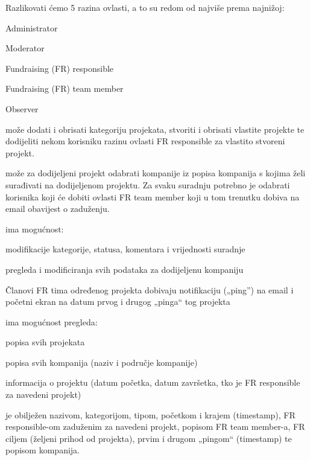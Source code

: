 		{Razlikovati ćemo 5 razina ovlasti, a to su redom od najviše prema najnižoj:}
		\begin{packed_item}
			\item {Administrator}
			\item {Moderator}
			\item {Fundraising (FR) responsible}
			\item {Fundraising (FR) team member}
			\item {Observer}
		\end{packed_item}

		{ može dodati i obrisati kategoriju projekata, stvoriti i obrisati vlastite projekte te dodijeliti nekom korisniku razinu ovlasti FR responsible za vlastito stvoreni projekt.}\vspace{0.5}

		{ može za dodijeljeni projekt odabrati kompanije iz popisa kompanija s kojima želi surađivati na dodijeljenom projektu. Za svaku suradnju potrebno je odabrati korisnika koji će dobiti ovlasti FR team member koji u tom trenutku dobiva na email obavijest o zaduženju.}\vspace{0.5cm}

		{ ima mogućnost:}
		\begin{packed_item}
			\item {modifikacije kategorije, statusa, komentara i vrijednosti suradnje}
			\item {pregleda i modificiranja svih podataka za dodijeljenu kompaniju}
		\end{packed_item}

		{Članovi FR tima određenog projekta dobivaju notifikaciju („ping”) na email i početni ekran na datum prvog i drugog „pinga“ tog projekta}			\vspace{0.5cm}

		{ ima mogućnost pregleda:}
		\begin{packed_item}
			\item {popisa svih projekata}
			\item {popisa svih kompanija (naziv i područje kompanije)}
			\item {informacija o projektu (datum početka, datum završetka, tko je FR responsible za navedeni projekt)}\vspace{0.3cm}
		\end{packed_item}

		{ je obilježen nazivom, kategorijom, tipom, početkom i krajem (timestamp), FR responsible-om zaduženim za navedeni projekt, popisom FR team member-a, FR ciljem (željeni prihod od projekta), prvim i drugom „pingom“ (timestamp) te popisom kompanija.}\\
\\
\\

